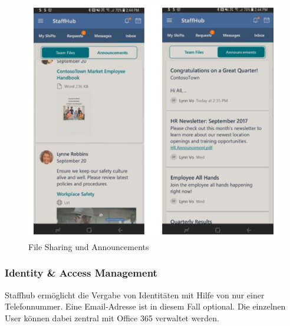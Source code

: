 \begin{figure}[H] 
\centering 
\includegraphics[scale=0.78]{images/communication} 
\caption[File Sharing und Announcements]{File Sharing und Announcements\protect} 
\label{ws} 
\end{figure}

\subsubsection{Identity \& Access Management}

Staffhub ermöglicht die Vergabe von Identitäten mit Hilfe von nur einer Telefonnummer. Eine Email-Adresse ist in diesem Fall optional. Die einzelnen User können dabei zentral mit Office 365 verwaltet werden.

